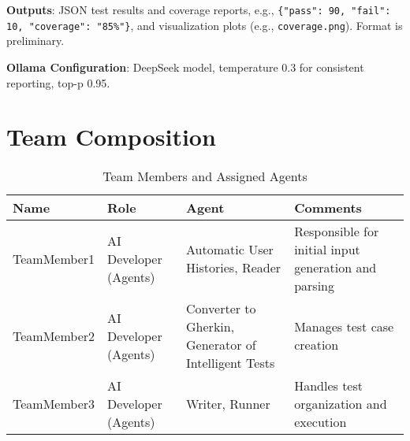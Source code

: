 \documentclass{article}
\begin{document}
\textbf{Outputs}: JSON test results and coverage reports, e.g., \texttt{\{"pass": 90, "fail": 10, "coverage": "85\%"\}}, and visualization plots (e.g., \texttt{coverage.png}). Format is preliminary.

\textbf{Ollama Configuration}: DeepSeek model, temperature 0.3 for consistent reporting, top-p 0.95.

\newpage
\section{Team Composition}

\begin{table}[h]
\centering
\begin{tabular}{|>{\raggedright\arraybackslash}p{}|>{\raggedright\arraybackslash}p{}|>{\raggedright\arraybackslash}p{}|>{\raggedright\arraybackslash}p{}|}
\hline
\textbf{Name} & \textbf{Role} & \textbf{Agent} & \textbf{Comments} \\ \hline
TeamMember1 & AI Developer (Agents) & Automatic User Histories, Reader & Responsible for initial input generation and parsing \\ \hline
TeamMember2 & AI Developer (Agents) & Converter to Gherkin, Generator of Intelligent Tests & Manages test case creation \\ \hline
TeamMember3 & AI Developer (Agents) & Writer, Runner & Handles test organization and execution \\ \hline
\end{tabular}
\caption{Team Members and Assigned Agents}
\end{table}
\end{document}
